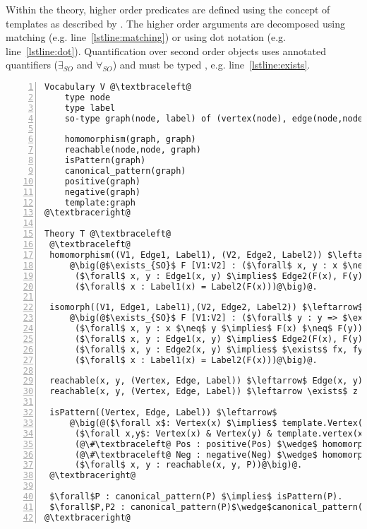 Within the theory, higher order predicates are defined using the concept of templates as described by \cite{DBLP:journals/tplp/DassevilleHJD15}. %
The higher order arguments are decomposed using matching (e.g. line~\ref{lstline:matching}) or using dot notation (e.g. line~\ref{lstline:dot}).
Quantification over second order objects uses annotated quantifiers ($\exists_{SO}$ and $\forall_{SO}$) and must be typed , e.g. line~\ref{lstline:exists}.

\begin{lstlisting}[mathescape,style=model,caption={Faithful encoding},label=lst:faithful, numbers=left]
Vocabulary V @\textbraceleft@
    type node
    type label
    so-type graph(node, label) of (vertex(node), edge(node,node), label(node):label)
    
    homomorphism(graph, graph)
    reachable(node,node, graph)
    isPattern(graph)
    canonical_pattern(graph)
    positive(graph)
    negative(graph)
    template:graph
@\textbraceright@ 

Theory T @\textbraceleft@ 
 @\textbraceleft@
 homomorphism((V1, Edge1, Label1), (V2, Edge2, Label2)) $\leftarrow$@\label{lstline:matching}@
     @\big(@$\exists_{SO}$ F [V1:V2] : ($\forall$ x, y : x $\neq$ y $\implies$ F(x) $\neq$ F(y)) $\wedge$@\label{lstline:exists}@
      ($\forall$ x, y : Edge1(x, y) $\implies$ Edge2(F(x), F(y))) $\wedge$
      ($\forall$ x : Label1(x) = Label2(F(x)))@\big)@.

 isomorph((V1, Edge1, Label1),(V2, Edge2, Label2)) $\leftarrow$
     @\big(@$\exists_{SO}$ F [V1:V2] : ($\forall$ y : y => $\exists$ x : F(x)=y) $\land$ 
      ($\forall$ x, y : x $\neq$ y $\implies$ F(x) $\neq$ F(y)) $\wedge$
      ($\forall$ x, y : Edge1(x, y) $\implies$ Edge2(F(x), F(y))) $\wedge$              
      ($\forall$ x, y : Edge2(x, y) $\implies$ $\exists$ fx, fy : Edge1(fx, fy) $\land$ x = F(fx) $\land$ y = F(fy)) $\wedge$
      ($\forall$ x : Label1(x) = Label2(F(x)))@\big)@.

 reachable(x, y, (Vertex, Edge, Label)) $\leftarrow$ Edge(x, y) $\lor$ Edge(y, x).
 reachable(x, y, (Vertex, Edge, Label)) $\leftarrow \exists$ z : reachable(x, z, (Edge, Label)) $\wedge$ reachable(z, y, (Edge, Label)).

 isPattern((Vertex, Edge, Label)) $\leftarrow$
     @\big(@($\forall x$: Vertex(x) $\implies$ template.Vertex(x)) $\land$@\label{lstline:dot}@
      ($\forall x,y$: Vertex(x) & Vertex(y) & template.vertex(x) & template.vertex(y) & template.Edge(x,y) $\implies$ Edge(x,y)) $\land$ 
      (@\#\textbraceleft@ Pos : positive(Pos) $\wedge$ homomorphism(P, Pos) @\textbraceright@ $\geq$ $N_{+}$) $\land$
      (@\#\textbraceleft@ Neg : negative(Neg) $\wedge$ homomorphism(P, Neg) @\textbraceright@ $\leq$ $N_{-}$) $\land$
      ($\forall$ x, y : reachable(x, y, P))@\big)@.
 @\textbraceright@
      
 $\forall$P : canonical_pattern(P) $\implies$ isPattern(P). 
 $\forall$P,P2 : canonical_pattern(P)$\wedge$canonical_pattern(P2)$\wedge$P$\neq$P2 $\implies$ $\neg$isomorph(P, P2).
@\textbraceright@ 
\end{lstlisting}

